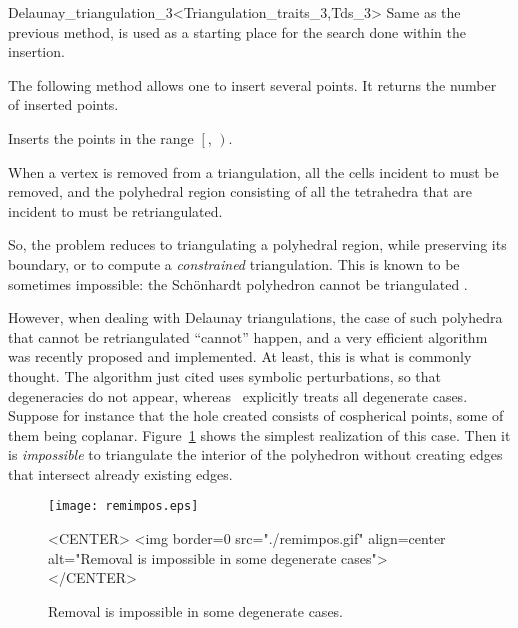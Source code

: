 \begin{ccRefClass}{Delaunay_triangulation_3<Triangulation_traits_3,Tds_3>}
{Same as the previous method,  is used as a starting
place for the search done within the insertion.}

The following method allows one to insert several points. It returns the
number of inserted points. 

{Inserts the points in the range $\left[\right.$,
$\left.\right)$. 
}


When a vertex  is removed from a triangulation, all the cells
incident to  must be removed, and the polyhedral region
consisting of all the tetrahedra that are incident to  must be
retriangulated. 

So, the problem reduces to triangulating a polyhedral
region, while preserving its boundary, or to compute a
\textit{constrained} triangulation. This is known to be sometimes
impossible: the Sch\"onhardt polyhedron cannot be triangulated
\cite{s-cgehd-98}. 

However, when dealing with Delaunay triangulations, the case of such
polyhedra that cannot be retriangulated ``cannot'' happen, and a very
efficient algorithm was recently proposed \cite{d-ddt-99} and
implemented. At least, this is what is commonly thought. The algorithm 
just cited uses symbolic perturbations, so that degeneracies do not
appear, whereas \cgal\ explicitly treats all degenerate cases.
Suppose for instance that the hole created consists of cospherical
points, some of them being coplanar.
Figure~\ref{Triangulation3-fig-remimpos} shows the simplest
realization of this case. Then it is \textit{impossible} to
triangulate the interior of the polyhedron without creating edges that
intersect already existing edges.

\begin{figure}[htbp]
\begin{ccTexOnly}
\begin{center} 
\texttt{[image: remimpos.eps]} 
\end{center}
\end{ccTexOnly}
\caption{Removal is impossible in some degenerate cases.
\label{Triangulation3-fig-remimpos}}
\begin{ccHtmlOnly}
<CENTER>
<img border=0 src="./remimpos.gif" align=center alt="Removal is impossible in some degenerate cases">
</CENTER>
\end{ccHtmlOnly}
\end{figure} 


\end{ccRefClass}
